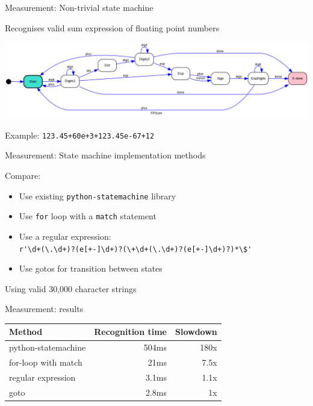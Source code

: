 \documentclass{beamer}
\begin{document}
\begin{frame}[fragile]{Measurement: Non-trivial state machine}

    Recognises valid sum expression of floating point numbers

\includegraphics[scale=0.25]{fp_sum_expr.png}

    Example: \verb!123.45+60e+3+123.45e-67+12!
\end{frame}

\begin{frame}[fragile]{Measurement: State machine implementation methods}

    Compare:
\vspace{1cm}
\begin{itemize}
    \item Use existing \verb!python-statemachine! library
    \item Use \verb!for! loop with a \verb!match! statement
    \item Use a regular expression: \\
        \verb!r'\d+(\.\d+)?(e[+-]\d+)?(\+\d+(\.\d+)?(e[+-]\d+)?)*\$'!
    \item Use gotos for transition between states
\end{itemize}
\vspace{1cm}
    Using valid 30,000 character strings

\end{frame}
%
%
%

\begin{frame}[fragile]{Measurement: results}
    \begin{table}[]
\begin{tabular}{l|r|r}
 Method & Recognition time & Slowdown \\
 \hline
python-statemachine & 504ms & 180x  \\
for-loop with match & 21ms & 7.5x  \\
regular expression & 3.1ms & 1.1x  \\
goto & 2.8ms & 1x
\end{tabular}
\end{table}
\end{frame}
\end{document}
